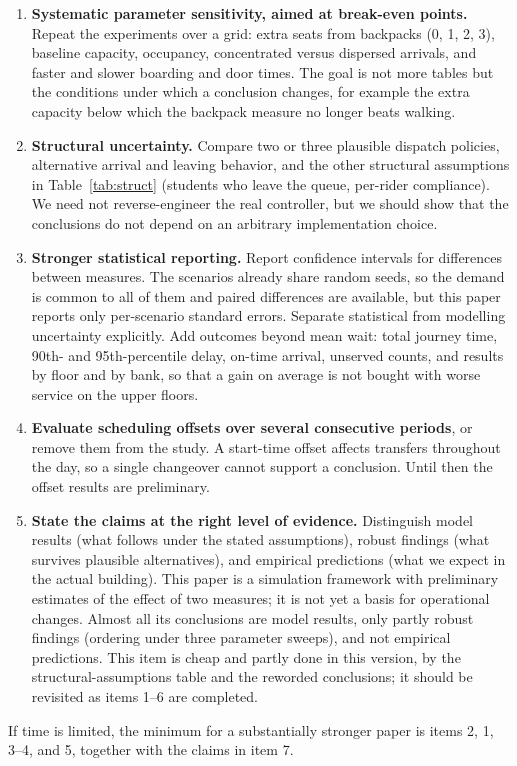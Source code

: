 \begin{enumerate}
that this accounting is correct.
\item \textbf{Systematic parameter sensitivity, aimed at break-even points.} Repeat the experiments over a grid:
extra seats from backpacks (0, 1, 2, 3), baseline capacity, occupancy, concentrated versus dispersed arrivals, and
faster and slower boarding and door times. The goal is not more tables but the conditions under which a conclusion
changes, for example the extra capacity below which the backpack measure no longer beats walking.
\item \textbf{Structural uncertainty.} Compare two or three plausible dispatch policies, alternative arrival and
leaving behavior, and the other structural assumptions in Table~\ref{tab:struct} (students who leave the queue,
per-rider compliance). We need not reverse-engineer the real controller, but we should show that the conclusions
do not depend on an arbitrary implementation choice.
\item \textbf{Stronger statistical reporting.} Report confidence intervals for differences between measures. The
scenarios already share random seeds, so the demand is common to all of them and paired differences are
available, but this paper reports only per-scenario standard errors. Separate statistical from modelling
uncertainty explicitly. Add outcomes beyond mean wait: total journey time, 90th- and 95th-percentile delay, on-time
arrival, unserved counts, and results by floor and by bank, so that a gain on average is not bought with worse
service on the upper floors.
\item \textbf{Evaluate scheduling offsets over several consecutive periods}, or remove them from the study. A
start-time offset affects transfers throughout the day, so a single changeover cannot support a conclusion. Until
then the offset results are preliminary.
\item \textbf{State the claims at the right level of evidence.} Distinguish model results (what follows under the
stated assumptions), robust findings (what survives plausible alternatives), and empirical predictions (what we
expect in the actual building). This paper is a simulation framework with preliminary estimates of the effect of two
measures; it is not yet a basis for operational changes. Almost all its conclusions are model results, only
partly robust findings (ordering under three parameter sweeps), and not empirical predictions. This item is cheap and
partly done in this version, by the structural-assumptions table and the reworded conclusions; it should be
revisited as items 1--6 are completed.
\end{enumerate}

If time is limited, the minimum for a substantially stronger paper is items 2, 1, 3--4, and 5, together with the
claims in item 7.
